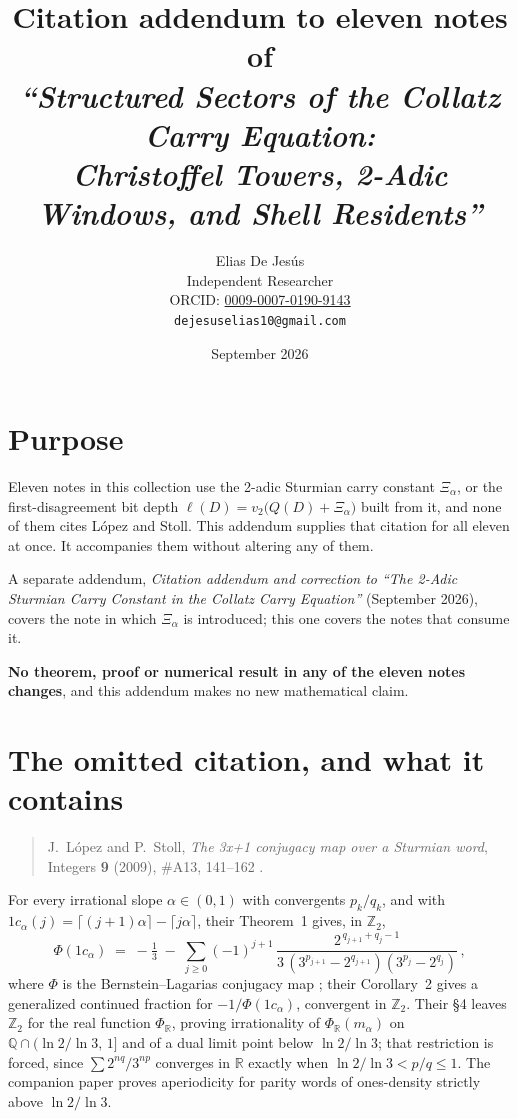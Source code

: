 \documentclass[10pt]{article}
\title{Citation addendum to eleven notes of \\
\emph{``Structured Sectors of the Collatz Carry Equation: \\
Christoffel Towers, 2-Adic Windows, and Shell Residents''}}
\author{Elias De Jes\'us\\
\small Independent Researcher\\
\small ORCID: \href{https://orcid.org/0009-0007-0190-9143}{0009-0007-0190-9143}\\
\small \texttt{dejesuselias10@gmail.com}}
\date{September 2026}
\newcommand{\Xa}{\Xi_{\alpha}}
\newcommand{\Ztwo}{\mathbb{Z}_2}
\begin{document}
\maketitle\vspace{-2.5em}

\section*{Purpose}

Eleven notes in this collection use the 2-adic Sturmian carry constant $\Xa$, or the
first-disagreement bit depth $\ell(D)=v_2\bigl(Q(D)+\Xa\bigr)$ built from it, and none of them
cites L\'opez and Stoll. This addendum supplies that citation for all eleven at once. It
accompanies them without altering any of them.

A separate addendum, \emph{Citation addendum and correction to ``The 2-Adic Sturmian Carry
Constant in the Collatz Carry Equation''} (September 2026), covers the note in which $\Xa$ is
introduced; this one covers the notes that consume it.

\textbf{No theorem, proof or numerical result in any of the eleven notes changes}, and this
addendum makes no new mathematical claim.

\section{The omitted citation, and what it contains}

\begin{quote}
J.~L\'opez and P.~Stoll, \emph{The 3x+1 conjugacy map over a Sturmian word}, Integers \textbf{9}
(2009), \#A13, 141--162 \cite{lopez2009conjugacy}.
\end{quote}

\noindent For every irrational slope $\alpha\in(0,1)$ with convergents $p_k/q_k$, and with
$1c_\alpha(j)=\lceil (j+1)\alpha\rceil-\lceil j\alpha\rceil$, their Theorem~1 gives, in $\Ztwo$,
\begin{equation}
\Phi(1c_\alpha) \;=\; -\tfrac13 \;-\; \sum_{j\ge 0} (-1)^{j+1}\,
\frac{2^{\,q_{j+1}+q_j-1}}{3\,(3^{p_{j+1}}-2^{q_{j+1}})(3^{p_j}-2^{q_j})}\,,
\label{eq:ls}
\end{equation}
where $\Phi$ is the Bernstein--Lagarias conjugacy map \cite{bernstein1996conjugacy}; their
Corollary~2 gives a generalized continued fraction for $-1/\Phi(1c_\alpha)$, convergent in $\Ztwo$.
Their \S4 leaves $\Ztwo$ for the real function $\Phi_{\mathbb{R}}$, proving irrationality of
$\Phi_{\mathbb{R}}(m_\alpha)$ on $\mathbb{Q}\cap(\ln 2/\ln 3,\,1]$ and of a dual limit point below
$\ln 2/\ln 3$; that restriction is forced, since $\sum 2^{nq}/3^{np}$ converges in $\mathbb{R}$
exactly when $\ln 2/\ln 3 < p/q \le 1$. The companion paper \cite{lopez2021periodicity} proves
aperiodicity for parity words of ones-density strictly above $\ln 2/\ln 3$.
\end{document}
